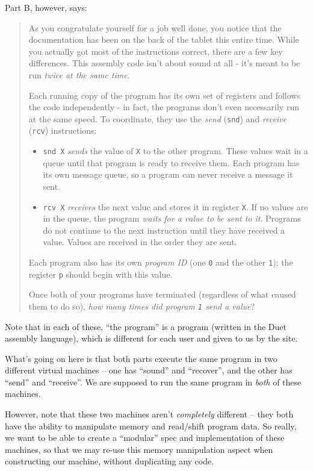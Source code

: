 \documentclass[]{article}
\begin{document}
Part B, however, says:

\begin{quote}
As you congratulate yourself for a job well done, you notice that the
documentation has been on the back of the tablet this entire time. While you
actually got most of the instructions correct, there are a few key differences.
This assembly code isn't about sound at all - it's meant to be run \emph{twice
at the same time}.

Each running copy of the program has its own set of registers and follows the
code independently - in fact, the programs don't even necessarily run at the
same speed. To coordinate, they use the \emph{send} (\texttt{snd}) and
\emph{receive} (\texttt{rcv}) instructions:

\begin{itemize}
\tightlist
\item
  \texttt{snd\ X} \emph{sends} the value of \texttt{X} to the other program.
  These values wait in a queue until that program is ready to receive them. Each
  program has its own message queue, so a program can never receive a message it
  sent.
\item
  \texttt{rcv\ X} \emph{receives} the next value and stores it in register
  \texttt{X}. If no values are in the queue, the program \emph{waits for a value
  to be sent to it}. Programs do not continue to the next instruction until they
  have received a value. Values are received in the order they are sent.
\end{itemize}

Each program also has its own \emph{program ID} (one \texttt{0} and the other
\texttt{1}); the register \texttt{p} should begin with this value.

Once both of your programs have terminated (regardless of what caused them to do
so), \emph{how many times did program \texttt{1} send a value}?
\end{quote}

Note that in each of these, ``the program'' is a program (written in the Duet
assembly language), which is different for each user and given to us by the
site.

What's going on here is that both parts execute the same program in two
different virtual machines -- one has ``sound'' and ``recover'', and the other
has ``send'' and ``receive''. We are supposed to run the same program in
\emph{both} of these machines.

However, note that these two machines aren't \emph{completely} different -- they
both have the ability to manipulate memory and read/shift program data. So
really, we want to be able to create a ``modular'' spec and implementation of
these machines, so that we may re-use this memory manipulation aspect when
constructing our machine, without duplicating any code.
\end{document}
